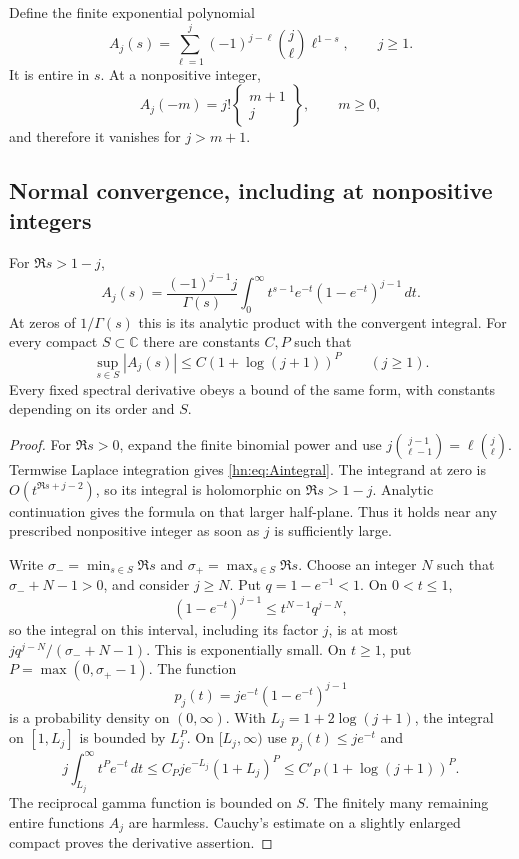 Define the finite exponential polynomial
\begin{equation}\label{hn:eq:Aj}
 A_j(s)=\sum_{\ell=1}^j(-1)^{j-\ell}\binom j\ell\ell^{1-s},
 \qquad j\ge1.
\end{equation}
It is entire in $s$. At a nonpositive integer,
\begin{equation}\label{hn:eq:Stirling}
 A_j(-m)=j!\left\{\begin{matrix}m+1\\j\end{matrix}\right\},
 \qquad m\ge0,
\end{equation}
and therefore it vanishes for $j>m+1$.

\subsection{Normal convergence, including at nonpositive integers}

\begin{lemma}\label{hn:lem:Aj}
For $\Re s>1-j$,
\begin{equation}\label{hn:eq:Aintegral}
 A_j(s)=\frac{(-1)^{j-1}j}{\Gamma(s)}
       \int_0^\infty t^{s-1}e^{-t}(1-e^{-t})^{j-1}\,dt.
\end{equation}
At zeros of $1/\Gamma(s)$ this is its analytic product with the
convergent integral. For every compact $S\subset\mathbb C$ there
are constants $C,P$ such that
\begin{equation}\label{hn:eq:Abound}
 \sup_{s\in S}|A_j(s)|\le C(1+\log(j+1))^P\qquad(j\ge1).
\end{equation}
Every fixed spectral derivative obeys a bound of the same form,
with constants depending on its order and $S$.
\end{lemma}

\begin{proof}
For $\Re s>0$, expand the finite binomial power and use
$j\binom{j-1}{\ell-1}=\ell\binom j\ell$.
Termwise Laplace integration gives \eqref{hn:eq:Aintegral}.
The integrand at zero is $O(t^{\Re s+j-2})$, so its integral is
holomorphic on $\Re s>1-j$. Analytic continuation gives the formula
on that larger half-plane. Thus it holds near any prescribed
nonpositive integer as soon as $j$ is sufficiently large.

Write $\sigma_-=\min_{s\in S}\Re s$ and
$\sigma_+=\max_{s\in S}\Re s$. Choose an integer $N$ such that
$\sigma_-+N-1>0$, and consider $j\ge N$. Put $q=1-e^{-1}<1$.
On $0<t\le1$,
\[
 (1-e^{-t})^{j-1}\le t^{N-1}q^{j-N},
\]
so the integral on this interval, including its factor $j$, is at
most $j q^{j-N}/(\sigma_-+N-1)$. This is exponentially small.
On $t\ge1$, put $P=\max(0,\sigma_+-1)$. The function
\[
                 p_j(t)=je^{-t}(1-e^{-t})^{j-1}
\]
is a probability density on $(0,\infty)$. With
$L_j=1+2\log(j+1)$, the integral on $[1,L_j]$ is bounded by $L_j^P$.
On $[L_j,\infty)$ use $p_j(t)\le je^{-t}$ and
\[
 j\int_{L_j}^\infty t^Pe^{-t}\,dt
 \le C_Pje^{-L_j}(1+L_j)^P
 \le C'_P(1+\log(j+1))^P.
\]
The reciprocal gamma function is bounded on $S$. The finitely many
remaining entire functions $A_j$ are harmless. Cauchy's estimate
on a slightly enlarged compact proves the derivative assertion.
\end{proof}

